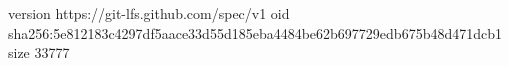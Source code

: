 version https://git-lfs.github.com/spec/v1
oid sha256:5e812183c4297df5aace33d55d185eba4484be62b697729edb675b48d471dcb1
size 33777
